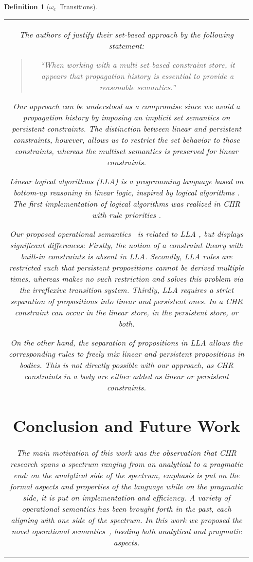 \documentclass{tlp}
\newtheorem{definition}{Definition}[section]
\newcommand{\oesq}{\ensuremath{{\omega_e}}}
\begin{document}
\begin{definition}[\oesq~Transitions]
\begin{center}
\begin{tabular*}{8.25cm}{c}
The authors of \cite{Sarna-Starosta2007} justify their set-based approach by the
following statement:
\begin{quotation} 
``When working with a multi-set-based constraint store, it appears that
propagation history is essential to provide a reasonable semantics.''
\end{quotation}
Our approach can be understood as a compromise since we avoid
a propagation history by imposing an implicit set semantics on persistent
constraints. The distinction between linear and persistent
constraints, however, allows us to restrict the set behavior to those
constraints, whereas the multiset semantics is
preserved for linear constraints.

Linear logical algorithms \cite{Simmons2008} (LLA) is a programming language
based on bottom-up reasoning in linear logic, inspired by logical algorithms
\cite{Ganzinger2002}. The first implementation of logical algorithms was realized
in CHR with rule priorities \cite{DeKoninck2009}. 

Our proposed operational semantics~ is related to LLA \cite{Simmons2008},
but displays significant differences: Firstly, the notion of a constraint theory
with built-in constraints is absent in LLA. Secondly, LLA rules are restricted
such that persistent propositions cannot be derived multiple times, whereas
 makes no such restriction and solves this problem via the irreflexive
transition system. Thirdly, LLA requires a strict separation of propositions into
linear and persistent ones. In  a CHR constraint can occur in the linear
store, in the persistent store, or both.

On the other hand, the separation of
propositions in LLA allows the corresponding rules to freely mix linear and persistent
propositions in bodies. This is not directly possible with our approach, as CHR
constraints in a body are either added as linear or persistent constraints.

\section{Conclusion and Future Work}
\label{sec:conclusion}

The main motivation of this work was the observation that CHR research spans a
spectrum ranging from an analytical to a pragmatic end: on the analytical side of
the spectrum, emphasis is put on the formal aspects and properties of the
language while on the pragmatic side, it is put on implementation and efficiency.
A variety of operational semantics has been brought forth in the past, each
aligning with one side of the spectrum. In this work we proposed the novel
operational semantics~, heeding both analytical and pragmatic aspects.


\end{tabular*}
\end{center}
\end{definition}
\end{document}
